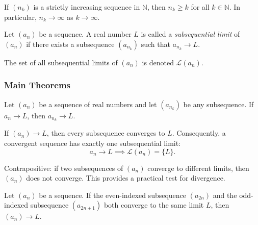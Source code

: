 \begin{lemma}
If $(n_k)$ is a strictly increasing sequence in $\mathbb{N}$, then $n_k \geq k$ for all $k \in \mathbb{N}$.
In particular, $n_k \to \infty$ as $k \to \infty$.
\end{lemma}



\begin{tcolorbox}[colback=propbox, colframe=propborder, arc=2pt,
  left=6pt, right=6pt, top=4pt, bottom=4pt,
  title={\small\textbf{Definition (Subsequential Limit)}},
  fonttitle=\small\bfseries]
Let $(a_n)$ be a sequence. A real number $L$ is called a \emph{subsequential limit}
of $(a_n)$ if there exists a subsequence $(a_{n_k})$ such that $a_{n_k} \to L$.

The set of all subsequential limits of $(a_n)$ is denoted $\mathcal{L}(a_n)$.
\end{tcolorbox}

\subsubsection{Main Theorems}

\begin{theorem}
Let $(a_n)$ be a sequence of real numbers and let $(a_{n_k})$ be any subsequence.
If $a_n \to L$, then $a_{n_k} \to L$.
\end{theorem}



\begin{remark}
If $(a_n) \to L$, then every subsequence converges to $L$.
Consequently, a convergent sequence has exactly one subsequential limit:
\[
a_n \to L \implies \mathcal{L}(a_n) = \{L\}.
\]
\end{remark}

\begin{remark}
Contrapositive: if two subsequences of $(a_n)$ converge to different limits,
then $(a_n)$ does not converge. This provides a practical test for divergence.
\end{remark}

\begin{theorem}
Let $(a_n)$ be a sequence. If the even-indexed subsequence $(a_{2n})$ and the
odd-indexed subsequence $(a_{2n+1})$ both converge to the same limit $L$,
then $(a_n) \to L$.
\end{theorem}



